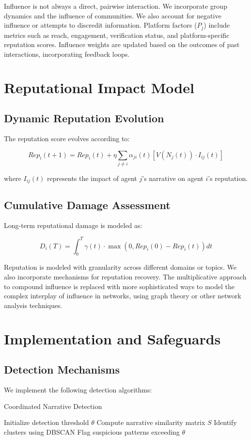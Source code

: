 \documentclass[12pt, a4paper]{article}
\begin{document}
Influence is not always a direct, pairwise interaction. We incorporate group dynamics and the influence of communities. We also account for negative influence or attempts to discredit information. Platform factors ($P_j$) include metrics such as reach, engagement, verification status, and platform-specific reputation scores. Influence weights are updated based on the outcomes of past interactions, incorporating feedback loops.

\section{Reputational Impact Model}
\subsection{Dynamic Reputation Evolution}
The reputation score evolves according to:

\begin{equation}
Rep_i(t+1) = Rep_i(t) + \eta \sum_{j \neq i} \alpha_{ji}(t)[V(N_j(t)) \cdot I_{ij}(t)]
\end{equation}

where $I_{ij}(t)$ represents the impact of agent $j$'s narrative on agent $i$'s reputation.

\subsection{Cumulative Damage Assessment}
Long-term reputational damage is modeled as:

\begin{equation}
D_i(T) = \int_0^T \gamma(t) \cdot \max(0, Rep_i(0) - Rep_i(t)) dt
\end{equation}

Reputation is modeled with granularity across different domains or topics. We also incorporate mechanisms for reputation recovery. The multiplicative approach to compound influence is replaced with more sophisticated ways to model the complex interplay of influence in networks, using graph theory or other network analysis techniques.

\section{Implementation and Safeguards}
\subsection{Detection Mechanisms}
We implement the following detection algorithms:
\begin{algorithm}[H]
\caption{Coordinated Narrative Detection}
\begin{algorithmic}[1]
\State Initialize detection threshold $\theta$
    \State Compute narrative similarity matrix $S$
    \State Identify clusters using DBSCAN
    \State Flag suspicious patterns exceeding $\theta$
\EndFor
\end{algorithmic}
\end{algorithm}
\end{document}
